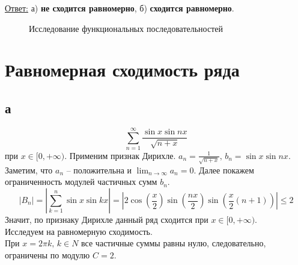 \documentclass[a5paper, 10pt]{article}
\theoremstyle{definition}
\theoremstyle{plain}
\theoremstyle{remark}
\begin{document}
\underline{Ответ:}  а) \textbf{не сходится равномерно}, б) \textbf{сходится равномерно}.
\begin{figure}[h]
	           \caption{Исследование функциональных последовательностей}		
\end{figure}


\newpage
\section{Равномерная сходимость ряда}
\subsection{а}
\begin{equation*}
\sum  \limits_{n = 1}^{\infty} \frac{\sin x \sin nx}{\sqrt{n + x}}
\end{equation*}
при $ x \in [0, + \infty)$.
Применим признак Дирихле. $a_n = \frac{1}{\sqrt{n + x}}, \, b_n = \sin x \sin nx$. Заметим, что $a_n$ -- положительна и $\lim_{n \to \infty} a_n = 0$. Далее покажем ограниченность модулей частичных сумм $ b_n$.
\begin{equation*}
\left| B_n \right| = \left| \sum  \limits_{k = 1}^{n}  \sin x \sin kx \right| = \left|  2 \cos \left(\frac{x}{2}\right) \sin \left(\frac{nx}{2}\right) \sin \left(\frac{x}{2}(n+1)\right) \right| \leq 2
\end{equation*}
Значит, по признаку Дирихле данный ряд сходится при $ x \in [0, + \infty)$.\\
Исследуем на равномерную сходимость. \\
При $x = 2 \pi k, \, k \in N$ все частичные суммы равны нулю, следовательно, ограничены по модулю $C=2$.
\end{document}

